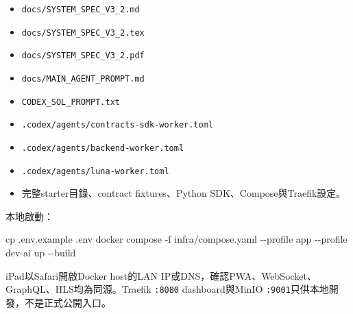 \documentclass[
  9pt,
  a4paper,
]{article}
\newenvironment{Shaded}{}{}
\newcommand{\AttributeTok}[1]{\textcolor[rgb]{0.49,0.56,0.16}{#1}}
\newcommand{\ExtensionTok}[1]{#1}
\newcommand{\FunctionTok}[1]{\textcolor[rgb]{0.02,0.16,0.49}{#1}}
\newcommand{\NormalTok}[1]{#1}
\providecommand{\tightlist}{%
  \setlength{\itemsep}{0pt}\setlength{\parskip}{0pt}}
\begin{document}
\begin{itemize}
\tightlist
\item
  \texttt{docs/SYSTEM\_\allowbreak{}SPEC\_\allowbreak{}V3\_\allowbreak{}2.md}
\item
  \texttt{docs/SYSTEM\_\allowbreak{}SPEC\_\allowbreak{}V3\_\allowbreak{}2.tex}
\item
  \texttt{docs/SYSTEM\_\allowbreak{}SPEC\_\allowbreak{}V3\_\allowbreak{}2.pdf}
\item
  \texttt{docs/MAIN\_\allowbreak{}AGENT\_\allowbreak{}PROMPT.md}
\item
  \texttt{CODEX\_\allowbreak{}SOL\_\allowbreak{}PROMPT.txt}
\item
  \texttt{.codex/agents/contracts-sdk-worker.toml}
\item
  \texttt{.codex/agents/backend-worker.toml}
\item
  \texttt{.codex/agents/luna-worker.toml}
\item
  完整starter目錄、contract fixtures、Python SDK、Compose與Traefik設定。
\end{itemize}

本地啟動：

\begin{Shaded}
\begin{Highlighting}[]
\FunctionTok{cp}\NormalTok{ .env.example .env}
\ExtensionTok{docker}\NormalTok{ compose }\AttributeTok{{-}f}\NormalTok{ infra/compose.yaml }\AttributeTok{{-}{-}profile}\NormalTok{ app }\AttributeTok{{-}{-}profile}\NormalTok{ dev{-}ai up }\AttributeTok{{-}{-}build}
\end{Highlighting}
\end{Shaded}

iPad以Safari開啟Docker host的LAN
IP或DNS，確認PWA、WebSocket、GraphQL、HLS均為同源。Traefik
\texttt{:8080} dashboard與MinIO
\texttt{:9001}只供本地開發，不是正式公開入口。
\end{document}
